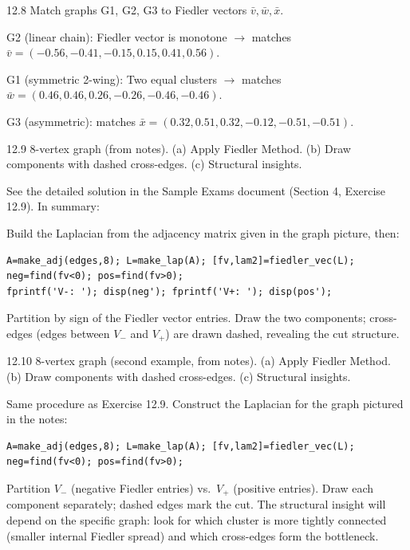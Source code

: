 \begin{exercise}{12.8}
Match graphs G1, G2, G3 to Fiedler vectors $\bar{v},\bar{w},\bar{x}$.
\end{exercise}
\begin{solution}
G2 (linear chain): Fiedler vector is monotone $\to$ matches $\bar{v}=(-0.56,-0.41,-0.15,0.15,0.41,0.56)$.

G1 (symmetric 2-wing): Two equal clusters $\to$ matches $\bar{w}=(0.46,0.46,0.26,-0.26,-0.46,-0.46)$.

G3 (asymmetric): matches $\bar{x}=(0.32,0.51,0.32,-0.12,-0.51,-0.51)$.
\end{solution}

\begin{exercise}{12.9}
8-vertex graph (from notes). (a) Apply Fiedler Method. (b) Draw components with dashed cross-edges. (c) Structural insights.
\end{exercise}
\begin{solution}
See the detailed solution in the Sample Exams document (Section 4, Exercise 12.9). In summary:

Build the Laplacian from the adjacency matrix given in the graph picture, then:
\begin{lstlisting}
A=make_adj(edges,8); L=make_lap(A); [fv,lam2]=fiedler_vec(L);
neg=find(fv<0); pos=find(fv>0);
fprintf('V-: '); disp(neg'); fprintf('V+: '); disp(pos');
\end{lstlisting}
Partition by sign of the Fiedler vector entries. Draw the two components; cross-edges (edges between $V_-$ and $V_+$) are drawn dashed, revealing the cut structure.
\end{solution}

\begin{exercise}{12.10}
8-vertex graph (second example, from notes). (a) Apply Fiedler Method. (b) Draw components with dashed cross-edges. (c) Structural insights.
\end{exercise}
\begin{solution}
Same procedure as Exercise 12.9. Construct the Laplacian for the graph pictured in the notes:
\begin{lstlisting}
A=make_adj(edges,8); L=make_lap(A); [fv,lam2]=fiedler_vec(L);
neg=find(fv<0); pos=find(fv>0);
\end{lstlisting}
Partition $V_-$ (negative Fiedler entries) vs.\ $V_+$ (positive entries). Draw each component separately; dashed edges mark the cut. The structural insight will depend on the specific graph: look for which cluster is more tightly connected (smaller internal Fiedler spread) and which cross-edges form the bottleneck.
\end{solution}

